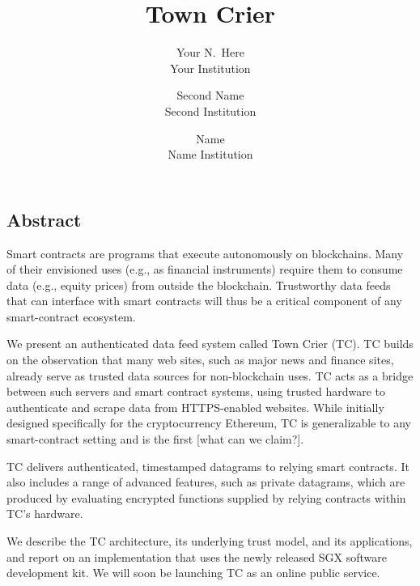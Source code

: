 \documentclass[letterpaper,twocolumn,10pt]{article}
\date{}
\title{\Large \bf Town Crier}
\author{
{\rm Your N.\ Here}\\
Your Institution
\and
{\rm Second Name}\\
Second Institution
\and
{\rm Name}\\
Name Institution
} %
\begin{document}
\maketitle


\subsection*{Abstract}
Smart contracts are programs that execute autonomously on blockchains. Many of their envisioned uses (e.g., as financial instruments) require them to consume data (e.g., equity prices) from outside the blockchain. Trustworthy data feeds that can interface with smart contracts will thus be a critical component of any smart-contract ecosystem.

	We present an authenticated data feed system called Town Crier (TC). TC builds on the observation that many web sites, such as major news and finance sites, already serve as trusted data sources for non-blockchain uses. TC acts as a bridge between such servers and smart contract systems, using trusted hardware to authenticate and scrape data from HTTPS-enabled websites. While initially designed specifically for the cryptocurrency Ethereum, TC is generalizable to any smart-contract setting and is the first [what can we claim?].
	
	TC delivers authenticated, timestamped datagrams to relying smart contracts. It also includes a range of advanced features, such as private datagrams, which are produced by evaluating encrypted functions supplied by relying contracts within TC's hardware.
	
	
	We describe the TC architecture, its underlying trust model, and its applications, and report on an implementation that uses the newly released SGX software development kit. We will soon be launching TC as an online public service.
	










\end{document}
